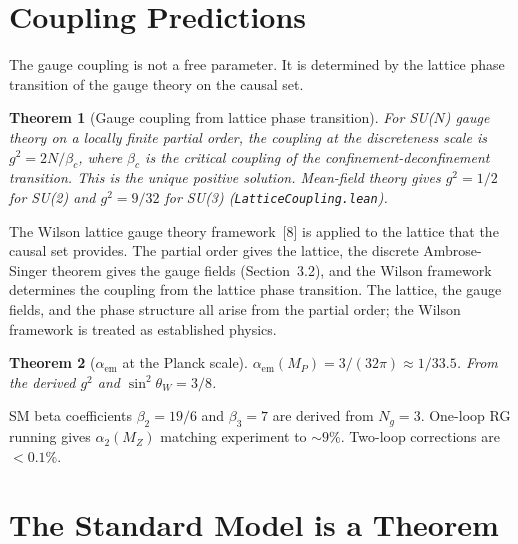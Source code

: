 \documentclass[11pt,letterpaper]{article}
\newtheorem{theorem}{Theorem}
\begin{document}
\section{Coupling Predictions}

The gauge coupling is not a free parameter.  It is determined by the
lattice phase transition of the gauge theory on the causal set.

\begin{theorem}[Gauge coupling from lattice phase transition]
\label{thm:coupling}
For SU($N$) gauge theory on a locally finite partial order, the
coupling at the discreteness scale is $g^2 = 2N/\beta_c$, where
$\beta_c$ is the critical coupling of the confinement-deconfinement
transition.  This is the unique positive solution.  Mean-field theory
gives $g^2 = 1/2$ for SU(2) and $g^2 = 9/32$ for SU(3)
(\texttt{LatticeCoupling.lean}).
\end{theorem}

\noindent The Wilson lattice gauge theory framework~[8] is applied to
the lattice that the causal set provides.  The partial order gives the
lattice, the discrete Ambrose-Singer theorem gives the gauge fields
(Section~3.2), and the Wilson framework determines the coupling from
the lattice phase transition.  The lattice, the gauge fields, and the
phase structure all arise from the partial order; the Wilson framework
is treated as established physics.

\begin{theorem}[$\alpha_{\mathrm{em}}$ at the Planck scale]
\label{thm:alpha}
$\alpha_{\mathrm{em}}(M_P) = 3/(32\pi) \approx 1/33.5$.  From
the derived $g^2$ and $\sin^2\theta_W = 3/8$.
\end{theorem}

\noindent SM beta coefficients $\beta_2 = 19/6$ and $\beta_3 = 7$
are derived from $N_g = 3$.  One-loop RG running gives
$\alpha_2(M_Z)$ matching experiment to $\sim 9\%$.  Two-loop
corrections are $< 0.1\%$.

\section{The Standard Model is a Theorem}
\end{document}
